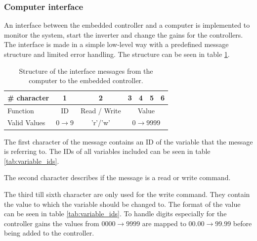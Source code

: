 \subsubsection{Computer interface}
An interface between the embedded controller and a computer is implemented to monitor the system, start the inverter and change the gains for the controllers. The interface is made in a simple low-level way with a predefined message structure and limited error handling. The structure can be seen in table \ref{tab:message_structure}. 


\begin{table}[H]
\centering
\begin{tabular}{|l|c|c|c|c|c|c|}
\hline
\# character       & 1       & 2                 & 3            & 4            & 5       & 6   \\ \hline
Function      & ID  & Read / Write                     & \multicolumn{4}{c|}{Value}               \\ \hline
Valid Values & $0\rightarrow 9$ & 'r'/'w'  & \multicolumn{4}{c|}{$0\rightarrow 9999$} \\ \hline
\end{tabular}
\caption{Structure of the interface messages from the computer to the embedded controller.}
\label{tab:message_structure}
\end{table}

The first character of the message contains an ID of the variable that the message is referring to. The IDs of all variables included can be seen in table \ref{tab:variable_ids}.

The second character describes if the message is a read or write command.

The third till sixth character are only used for the write command. They contain the value to which the variable should be changed to. The format of the value can be seen in table \ref{tab:variable_ids}. To handle digits especially for the controller gains the values from $0000 \rightarrow 9999$ are mapped to $00.00 \rightarrow 99.99$ before being added to the controller.


